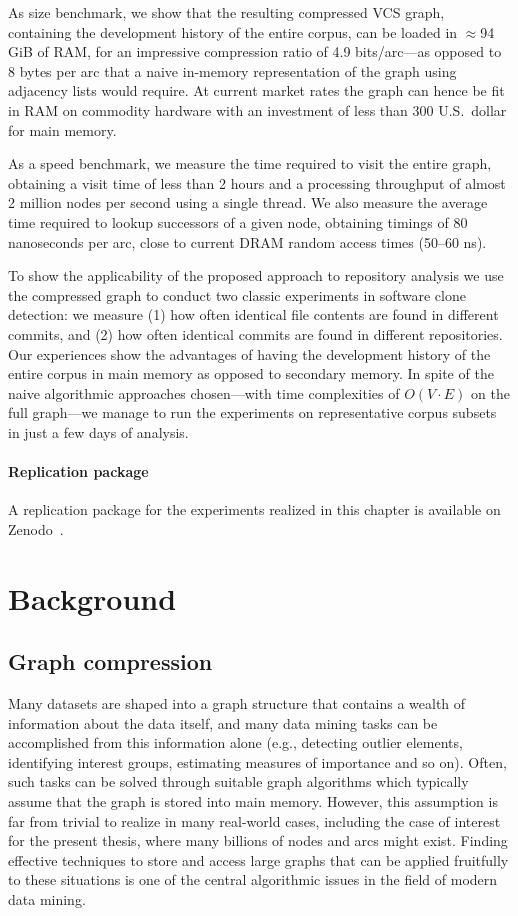 As size benchmark, we show that the resulting compressed VCS graph, containing
the development history of the entire corpus, can be loaded in $\approx$94\,GiB
of RAM, for an impressive compression ratio of 4.9 bits/arc---as opposed to 8
bytes per arc that a naive in-memory representation of the graph using
adjacency lists would require. At current market rates the graph can hence be
fit in RAM on commodity hardware with an investment of less than 300
U.S.~dollar for main memory.

As a speed benchmark, we measure the time required to visit the entire graph,
obtaining a visit time of less than 2 hours and a processing throughput of
almost 2 million nodes per second using a single thread. We also measure the
average time required to lookup successors of a given node, obtaining timings
of 80 nanoseconds per arc, close to current DRAM random access times (50--60
ns).

To show the applicability of the proposed approach to repository analysis we
use the compressed graph to conduct two classic experiments in software clone
detection: we measure (1) how often identical file contents are found in
different commits, and (2) how often identical commits are found in different
repositories. Our experiences show the advantages of having the development
history of the entire corpus in main memory as opposed to secondary memory.
In spite of the naive algorithmic approaches chosen---with time complexities
of $O(V\cdot E)$ on the full graph---we manage to run the experiments on
representative corpus subsets in just a few days of analysis.

\paragraph*{Replication package}
A replication package for the experiments realized in this chapter is available
on Zenodo~\cite{swh-saner2020graph-replication}.

\section{Background}%
\label{sec:compression-background}

\subsection{Graph compression}

Many datasets are shaped into a graph structure that contains a wealth of
information about the data itself, and many data mining tasks can be
accomplished from this information alone (e.g., detecting outlier elements,
identifying interest groups, estimating measures of importance and so
on). Often, such tasks can be solved through suitable graph algorithms which
typically assume that the graph is stored into main memory.  However, this
assumption is far from trivial to realize in many real-world cases, including
the case of interest for the present thesis, where many billions of nodes and
arcs might exist. Finding effective techniques to store and access large graphs
that can be applied fruitfully to these situations is one of the central
algorithmic issues in the field of modern data mining.

